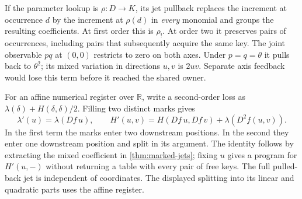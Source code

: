 \documentclass[11pt,a4paper]{article}
\theoremstyle{definition}
\theoremstyle{remark}\newaliascnt{remark}{theorem}
\newcommand{\R}{\mathbb R}
\numberwithin{equation}{section}
\begin{document}
If the parameter lookup is $\rho:D\to K$, its jet pullback replaces the increment at occurrence $d$ by the increment at $\rho(d)$ in \emph{every} monomial and groups the resulting coefficients. At first order this is $\rho_!$. At order two it preserves pairs of occurrences, including pairs that subsequently acquire the same key. The joint observable $pq$ at $(0,0)$ restricts to zero on both axes. Under $p=q=\theta$ it pulls back to $\theta^2$; its mixed variation in directions $u,v$ is $2uv$. Separate axis feedback would lose this term before it reached the shared owner.

For an affine numerical register over $\R$, write a second-order loss as $\lambda(\delta)+H(\delta,\delta)/2$. Filling two distinct marks gives
\[
 \lambda'(u)=\lambda(Df\,u),\qquad
 H'(u,v)=H(Df\,u,Df\,v)+\lambda(D^2f(u,v)).
\]
In the first term the marks enter two downstream positions. In the second they enter one downstream position and split in its argument. The identity follows by extracting the mixed coefficient in \cref{thm:marked-jets}; fixing $u$ gives a program for $H'(u,-)$ without returning a table with every pair of free keys. The full pulled-back jet is independent of coordinates. The displayed splitting into its linear and quadratic parts uses the affine register.
\end{document}
